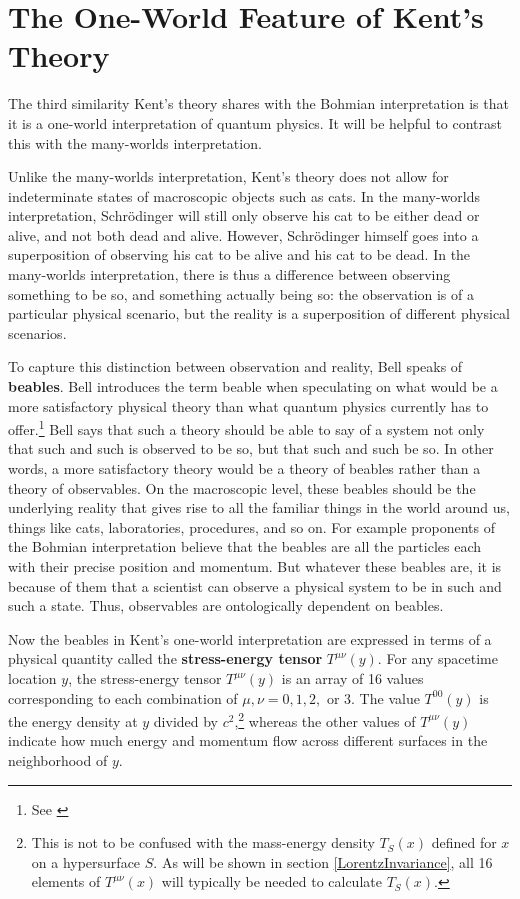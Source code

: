 
\section{The One-World Feature of Kent's Theory\label{OneWorldFeature}}
The third similarity Kent's theory shares with the Bohmian interpretation is that it is a one-world interpretation of quantum physics. It will be helpful to contrast this with the many-worlds interpretation. 

 Unlike the many-worlds interpretation, Kent's theory does not allow for indeterminate states of macroscopic objects such as cats. In the many-worlds interpretation, Schr\"{o}dinger will still only observe his cat to be either dead or alive, and not both dead and alive. However, Schr\"{o}dinger himself goes into a superposition of observing his cat to be alive and his cat to be dead. In the many-worlds interpretation, there is thus a difference between observing something to be so, and something actually being so: the observation is of a particular physical scenario, but the reality is a superposition of different physical scenarios. 

To capture this distinction between observation and reality, Bell speaks of \textbf{beables}.\label{beabledef} Bell introduces the term beable when speculating on what would be a more satisfactory physical theory than what quantum physics currently has to offer.\footnote{See \cite{Bell2}} Bell says that such a theory should be able to say of a system not only that such and such is observed to be so, but that such and such be so. In other words, a more satisfactory theory would be a theory of beables rather than a theory of observables. On the macroscopic level, these beables should be the underlying reality that gives rise to all the familiar things in the world around us, things like cats, laboratories, procedures, and so on. For example proponents of the Bohmian interpretation believe that the beables are all the particles each with their precise position and momentum. But whatever these beables are, it is because of them that a scientist can observe a physical system to be in such and such a state. Thus, observables are ontologically dependent on beables.   

Now the beables in Kent's one-world interpretation are expressed in terms of a physical quantity called the \textbf{stress-energy tensor}  $T^{\mu\nu}(y)$.\label{stressenergy}   %
%
For any spacetime location $y$, the stress-energy tensor $T^{\mu\nu}(y)$ is an array of 16 values corresponding to each combination of $\mu, \nu=0,1,2,$ or $3$. %
%
 The value $T^{00}(y)$ is the energy density at $y$ divided by $c^2$,\footnote{This is not to be confused with the mass-energy density $T_S(x)$ defined for $x$ on a hypersurface $S$. As will be shown in section \ref{LorentzInvariance},   all 16 elements of $T^{\mu\nu}(x)$ will typically be needed to calculate $T_S(x)$.} whereas the other values of $T^{\mu\nu}(y)$ indicate how much energy and momentum flow across different surfaces in the neighborhood of $y$. 



